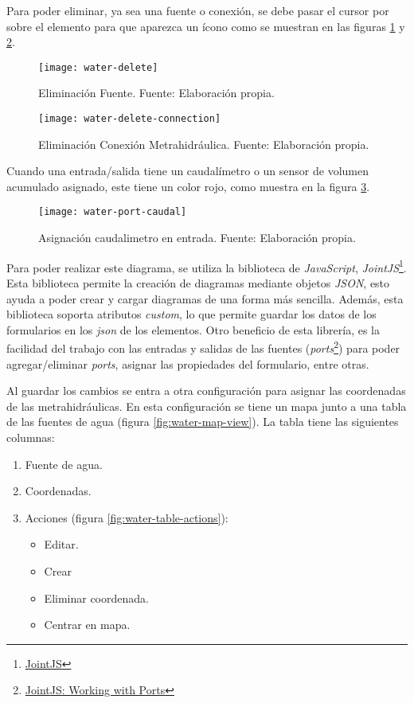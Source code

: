 Para poder eliminar, ya sea una fuente o conexión, se debe pasar el cursor por sobre el elemento para que aparezca un ícono como se muestran en las figuras \ref{fig:water-delete} y \ref{fig:water-delete-connection}.

\begin{figure}[H]
	\centering
	\texttt{[image: water-delete]}
	\caption{\label{fig:water-delete} Eliminación Fuente. Fuente: Elaboración propia.}
\end{figure}

\begin{figure}[H]
	\centering
	\texttt{[image: water-delete-connection]}
	\caption{\label{fig:water-delete-connection} Eliminación Conexión Metrahidráulica. Fuente: Elaboración propia.}
\end{figure}

Cuando una entrada/salida tiene un caudalímetro o un sensor de volumen acumulado asignado, este tiene un color rojo, como muestra en la figura \ref{fig:water-port-caudal}.

\begin{figure}[H]
	\centering
	\texttt{[image: water-port-caudal]}
	\caption{\label{fig:water-port-caudal} Asignación caudalimetro en entrada. Fuente: Elaboración propia.}
\end{figure}

Para poder realizar este diagrama, se utiliza la biblioteca de \textit{JavaScript}, \textit{JointJS}\footnote{\href{https://www.jointjs.com/}{JointJS}}. 
Esta biblioteca permite la creación de diagramas mediante objetos \textit{JSON}, esto ayuda a poder crear y cargar diagramas de una forma más sencilla. Además, esta biblioteca soporta atributos \textit{custom}, lo que permite guardar los datos de los formularios en los \textit{json} de los elementos.
Otro beneficio de esta librería, es la facilidad del trabajo con las entradas y salidas de las fuentes (\textit{ports}\footnote{\href{https://resources.jointjs.com/tutorial/ports}{JointJS: Working with Ports}}) para poder agregar/eliminar \textit{ports}, asignar las propiedades del formulario, entre otras.

Al guardar los cambios se entra a otra configuración para asignar las coordenadas de las metrahidráulicas.
En esta configuración se tiene un mapa junto a una tabla de las fuentes de agua (figura \ref{fig:water-map-view}). La tabla tiene las siguientes columnas:
\begin{enumerate}
    \item Fuente de agua.
    \item Coordenadas.
    \item Acciones (figura \ref{fig:water-table-actions}):
          \begin{itemize}
            \item Editar.
            \item Crear
            \item Eliminar coordenada.
            \item Centrar en mapa.
          \end{itemize}
\end{enumerate}

